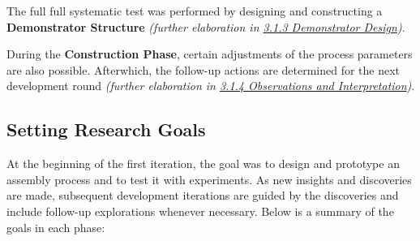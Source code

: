 \documentclass[11pt]{book}
\begin{document}
The full full systematic test was performed by designing and constructing a \textbf{Demonstrator Structure} \textit{(further elaboration in \underline{3.1.3 Demonstrator Design})}. 

During the \textbf{Construction Phase}, certain adjustments of the process parameters are also possible. Afterwhich, the follow-up actions are determined for the next development round\textbf{ }\textit{(further elaboration in \underline{3.1.4 Observations and Interpretation})}.

\subsection{Setting Research Goals}

At the beginning of the first iteration, the goal was to design and prototype an assembly process and to test it with experiments. As new insights and discoveries are made, subsequent development iterations are guided by the discoveries and include follow-up explorations whenever necessary. Below is a summary of the goals in each phase:
\end{document}
